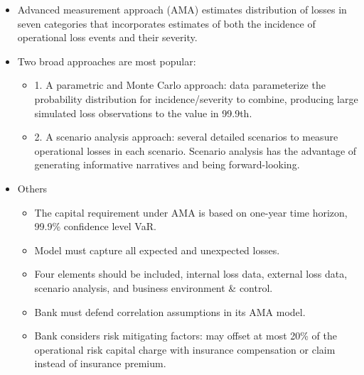 \begin{itemize}
\item Advanced measurement approach (AMA) estimates
distribution of losses in seven categories that incorporates estimates of both the incidence of operational loss events and their severity.

\item Two broad approaches are most popular:
    \begin{itemize}
    \item 1. A parametric and Monte Carlo approach: data parameterize the probability distribution for incidence/severity to combine, producing large simulated loss observations to the value in 99.9th.
    \item 2. A scenario analysis approach: several detailed scenarios to measure operational losses in each scenario. Scenario analysis has the advantage of generating informative narratives and being forward-looking.
    \end{itemize}
\item Others
    \begin{itemize}
    \item The capital requirement under AMA is based on one-year time horizon, 99.9\% confidence level VaR.
    \item  Model must capture all expected and unexpected losses.
    \item Four elements should be included, internal loss data, external loss data, scenario analysis, and business environment \& control.
    \item Bank must defend correlation assumptions in its AMA model.
    \item Bank considers risk mitigating factors: may offset at most 20\% of the operational risk capital charge with insurance compensation or claim instead of insurance premium.
    \end{itemize}

\end{itemize}


